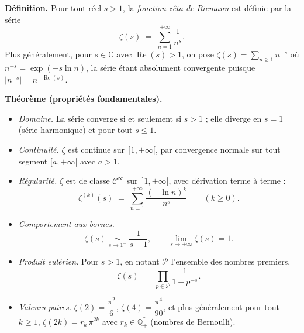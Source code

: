 



\begin{tcolorbox}[thmbox]
  \textbf{Définition.}\enspace{}
  Pour tout réel $s>1$, la \emph{fonction zêta de Riemann} est définie par la série
  \[
    \zeta(s) \;=\; \sum_{n=1}^{+\infty} \frac{1}{n^{s}}.
  \]
  Plus généralement, pour $s\in\mathbb{C}$ avec $\operatorname{Re}(s)>1$, on pose
  $\zeta(s)=\sum_{n\geq 1} n^{-s}$ où $n^{-s}=\exp(-s\ln n)$, la série étant
  absolument convergente puisque $|n^{-s}|=n^{-\operatorname{Re}(s)}$.

  \medskip
  \textbf{Théorème (propriétés fondamentales).}
  \begin{itemize}
    \item \textit{Domaine.} La série converge si et seulement si $s>1$ ; elle
    diverge en $s=1$ (série harmonique) et pour tout $s\leq 1$.
    \item \textit{Continuité.} $\zeta$ est continue sur $\,]1,+\infty[$, par
    convergence normale sur tout segment $[a,+\infty[$ avec $a>1$.
    \item \textit{Régularité.} $\zeta$ est de classe $\mathcal{C}^{\infty}$ sur
    $\,]1,+\infty[$, avec dérivation terme à terme :
    \[
      \zeta^{(k)}(s) \;=\; \sum_{n=1}^{+\infty} \frac{(-\ln n)^{k}}{n^{s}}
      \qquad (k\geq 0).
    \]
    \item \textit{Comportement aux bornes.}
    \[
      \zeta(s) \;\underset{s\to 1^{+}}{\sim}\; \frac{1}{s-1},
      \qquad
      \lim_{s\to +\infty} \zeta(s) = 1.
    \]
    \item \textit{Produit eulérien.} Pour $s>1$, en
    notant $\mathcal{P}$ l'ensemble des nombres premiers,
    \[
      \zeta(s) \;=\; \prod_{p\in\mathcal{P}} \frac{1}{1-p^{-s}}.
    \]
    \item \textit{Valeurs paires.} $\zeta(2)=\dfrac{\pi^{2}}{6}$,
    $\zeta(4)=\dfrac{\pi^{4}}{90}$, et plus généralement pour tout $k\geq 1$,
    $\zeta(2k)=r_{k}\,\pi^{2k}$ avec $r_{k}\in\mathbb{Q}_{+}^{*}$ (nombres de
    Bernoulli).
  \end{itemize}
\end{tcolorbox}

